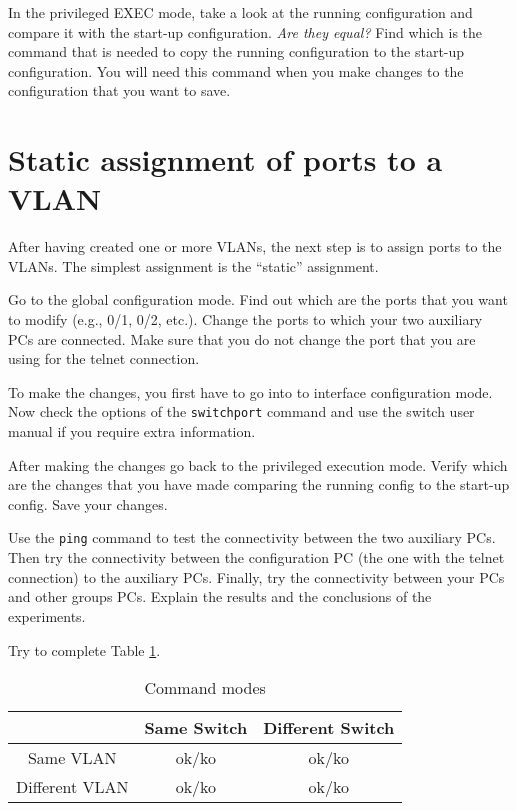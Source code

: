 In the privileged EXEC mode, take a look at the running configuration and compare it with the start-up configuration.
\emph{Are they equal?}
Find which is the command that is needed to copy the running configuration to the start-up configuration.
You will need this command when you make changes to the configuration that you want to save.

\section{Static assignment of ports to a VLAN}
\label{sec:static}

After having created one or more VLANs, the next step is to assign ports to the VLANs.
The simplest assignment is the ``static'' assignment.

Go to the global configuration mode.
Find out which are the ports that you want to modify (e.g., 0/1, 0/2, etc.).
Change the ports to which your two auxiliary PCs are connected.
Make sure that you do not change the port that you are using for the telnet connection.

To make the changes, you first have to go into to interface configuration mode.
Now check the options of the \texttt{switchport} command and use the switch user manual if you require extra information.

After making the changes go back to the privileged execution mode.
Verify which are the changes that you have made comparing the running config to the start-up config.
Save your changes.

Use the \texttt{ping} command to test the connectivity between the two auxiliary PCs.
Then try the connectivity between the configuration PC (the one with the telnet connection) to the auxiliary PCs.
Finally, try the connectivity between your PCs and other groups PCs.
Explain the results and the conclusions of the experiments.

Try to complete Table \ref{tab:connectivity}.

\begin{table}[!t]
\renewcommand{\arraystretch}{1.3}
\caption{Command modes}
\label{tab:connectivity}
\centering
\begin{tabular}{|c|c|c|}
\hline
& Same Switch & Different Switch\\
\hline
Same VLAN & ok/ko & ok/ko \\
\hline
Different VLAN & ok/ko & ok/ko \\
\hline
\end{tabular}
\end{table}


